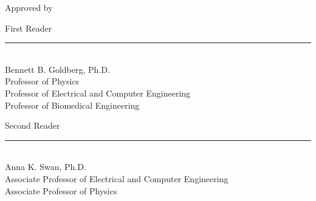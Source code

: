 \begin{titlepage}	%

\begin{center}
Approved by
\end{center}

\vspace{1.5in}
\baselineskip=13pt

\noindent
First Reader\ \ \ \ \  \ \rule{4.7in}{.005in}\\
\hspace*{1.15in}Bennett B. Goldberg, Ph.D.\\
\hspace*{1.15in}Professor of Physics \\
\hspace*{1.15in}Professor of Electrical and Computer Engineering \\
\hspace*{1.15in}Professor of Biomedical Engineering\\
\vspace{0.75in}

\noindent
Second Reader\ \ \ \rule{4.7in}{.005in}\\
\hspace*{1.15in}Anna K. Swan, Ph.D.\\
\hspace*{1.15in}Associate Professor of Electrical and Computer Engineering\\
\hspace*{1.15in}Associate Professor of Physics\\
\vspace{0.75in}

\end{titlepage}